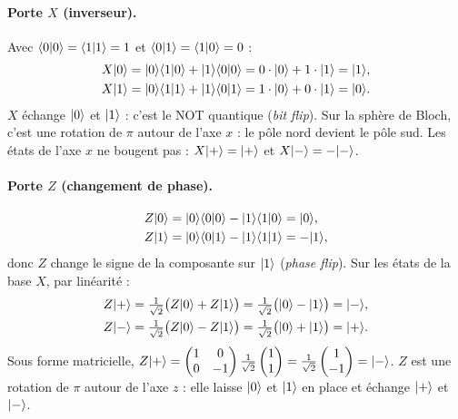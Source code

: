 \paragraph{Porte $X$ (inverseur).} Avec $\langle 0|0\rangle=\langle 1|1\rangle=1$ et
$\langle 0|1\rangle=\langle 1|0\rangle=0$ :
\begin{align*}
  X|0\rangle&=|0\rangle\langle 1|0\rangle+|1\rangle\langle 0|0\rangle=0\cdot|0\rangle+1\cdot|1\rangle=|1\rangle,\\
  X|1\rangle&=|0\rangle\langle 1|1\rangle+|1\rangle\langle 0|1\rangle=1\cdot|0\rangle+0\cdot|1\rangle=|0\rangle.
\end{align*}
$X$ échange $|0\rangle$ et $|1\rangle$ : c'est le NOT quantique (\emph{bit flip}). Sur la
sphère de Bloch, c'est une rotation de $\pi$ autour de l'axe $x$ : le pôle nord devient
le pôle sud. Les états de l'axe $x$ ne bougent pas : $X|+\rangle=|+\rangle$ et
$X|-\rangle=-|-\rangle$.

\paragraph{Porte $Z$ (changement de phase).}
\begin{align*}
  Z|0\rangle&=|0\rangle\langle 0|0\rangle-|1\rangle\langle 1|0\rangle=|0\rangle,\\
  Z|1\rangle&=|0\rangle\langle 0|1\rangle-|1\rangle\langle 1|1\rangle=-|1\rangle,
\end{align*}
donc $Z$ change le signe de la composante sur $|1\rangle$ (\emph{phase flip}). Sur les
états de la base $X$, par linéarité :
\begin{align*}
  Z|+\rangle&=\tfrac{1}{\sqrt2}\big(Z|0\rangle+Z|1\rangle\big)=\tfrac{1}{\sqrt2}\big(|0\rangle-|1\rangle\big)=|-\rangle,\\
  Z|-\rangle&=\tfrac{1}{\sqrt2}\big(Z|0\rangle-Z|1\rangle\big)=\tfrac{1}{\sqrt2}\big(|0\rangle+|1\rangle\big)=|+\rangle.
\end{align*}
Sous forme matricielle, $Z|+\rangle=\begin{pmatrix}1 & 0\\ 0 & -1\end{pmatrix}
\frac{1}{\sqrt2}\begin{pmatrix}1\\ 1\end{pmatrix}=\frac{1}{\sqrt2}\begin{pmatrix}1\\ -1\end{pmatrix}=|-\rangle$.
$Z$ est une rotation de $\pi$ autour de l'axe $z$ : elle laisse $|0\rangle$ et $|1\rangle$ en
place et échange $|+\rangle$ et $|-\rangle$.

